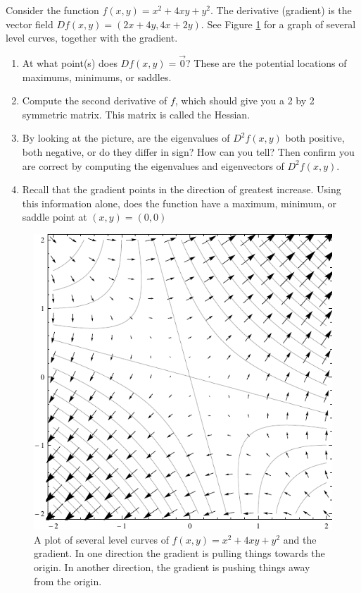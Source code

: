 \begin{problem}
 Consider the function $f(x,y)= x^2+4xy+y^2$. The derivative (gradient) is the vector field $Df(x,y) = (2x+4y,4x+2y)$. See Figure \ref{second derivative graph} for a graph of several level curves, together with the gradient.
\begin{enumerate}
\item At what point(s) does $Df(x,y)=\vec 0$? These are the potential locations of maximums, minimums, or saddles.   
\item Compute the second derivative of $f$, which should give you a 2 by 2 symmetric matrix. This matrix is called the Hessian.
\item By looking at the picture, are the eigenvalues of $D^2f(x,y)$ both positive, both negative, or do they differ in sign?  How can you tell? Then confirm you are correct by computing the eigenvalues and eigenvectors of $D^2f(x,y)$.  
\item Recall that the gradient points in the direction of greatest increase.  Using this information alone, does the function have a maximum, minimum, or saddle point at $(x,y)=(0,0)$
\end{enumerate}


\begin{figure}
 \begin{center}\includegraphics{second-derivative-test}\end{center}
\caption{A plot of several level curves of $f(x,y)=x^2+4xy+y^2$ and the gradient. In one direction the gradient is pulling things towards the origin.  In another direction, the gradient is pushing things away from the origin. \label{second derivative graph}}
\end{figure}
\end{problem}
 
